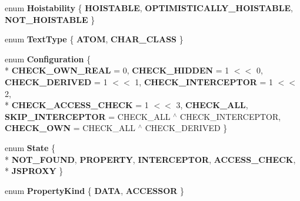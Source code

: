 \begin{DoxyCompactItemize}
\item 
\hypertarget{classv8_1_1internal_1_1_b_a_s_e___e_m_b_e_d_d_e_d_aa09619c6a12a554417df97fe40eab745}{}enum {\bfseries Hoistability} \{ {\bfseries H\+O\+I\+S\+T\+A\+B\+L\+E}, 
{\bfseries O\+P\+T\+I\+M\+I\+S\+T\+I\+C\+A\+L\+L\+Y\+\_\+\+H\+O\+I\+S\+T\+A\+B\+L\+E}, 
{\bfseries N\+O\+T\+\_\+\+H\+O\+I\+S\+T\+A\+B\+L\+E}
 \}\label{classv8_1_1internal_1_1_b_a_s_e___e_m_b_e_d_d_e_d_aa09619c6a12a554417df97fe40eab745}

\item 
\hypertarget{classv8_1_1internal_1_1_b_a_s_e___e_m_b_e_d_d_e_d_adff2dd6e8aec0ffdabe2135301a1dbb6}{}enum {\bfseries Text\+Type} \{ {\bfseries A\+T\+O\+M}, 
{\bfseries C\+H\+A\+R\+\_\+\+C\+L\+A\+S\+S}
 \}\label{classv8_1_1internal_1_1_b_a_s_e___e_m_b_e_d_d_e_d_adff2dd6e8aec0ffdabe2135301a1dbb6}

\item 
\hypertarget{classv8_1_1internal_1_1_b_a_s_e___e_m_b_e_d_d_e_d_ad8a2e468fa3dc4653942cd4be018625a}{}enum {\bfseries Configuration} \{ \\*
{\bfseries C\+H\+E\+C\+K\+\_\+\+O\+W\+N\+\_\+\+R\+E\+A\+L} = 0, 
{\bfseries C\+H\+E\+C\+K\+\_\+\+H\+I\+D\+D\+E\+N} = 1 $<$$<$ 0, 
{\bfseries C\+H\+E\+C\+K\+\_\+\+D\+E\+R\+I\+V\+E\+D} = 1 $<$$<$ 1, 
{\bfseries C\+H\+E\+C\+K\+\_\+\+I\+N\+T\+E\+R\+C\+E\+P\+T\+O\+R} = 1 $<$$<$ 2, 
\\*
{\bfseries C\+H\+E\+C\+K\+\_\+\+A\+C\+C\+E\+S\+S\+\_\+\+C\+H\+E\+C\+K} = 1 $<$$<$ 3, 
{\bfseries C\+H\+E\+C\+K\+\_\+\+A\+L\+L}, 
{\bfseries S\+K\+I\+P\+\_\+\+I\+N\+T\+E\+R\+C\+E\+P\+T\+O\+R} = C\+H\+E\+C\+K\+\_\+\+A\+L\+L $^\wedge$ C\+H\+E\+C\+K\+\_\+\+I\+N\+T\+E\+R\+C\+E\+P\+T\+O\+R, 
{\bfseries C\+H\+E\+C\+K\+\_\+\+O\+W\+N} = C\+H\+E\+C\+K\+\_\+\+A\+L\+L $^\wedge$ C\+H\+E\+C\+K\+\_\+\+D\+E\+R\+I\+V\+E\+D
 \}\label{classv8_1_1internal_1_1_b_a_s_e___e_m_b_e_d_d_e_d_ad8a2e468fa3dc4653942cd4be018625a}

\item 
\hypertarget{classv8_1_1internal_1_1_b_a_s_e___e_m_b_e_d_d_e_d_aea5e836b2c351dd71777783bbf36881f}{}enum {\bfseries State} \{ \\*
{\bfseries N\+O\+T\+\_\+\+F\+O\+U\+N\+D}, 
{\bfseries P\+R\+O\+P\+E\+R\+T\+Y}, 
{\bfseries I\+N\+T\+E\+R\+C\+E\+P\+T\+O\+R}, 
{\bfseries A\+C\+C\+E\+S\+S\+\_\+\+C\+H\+E\+C\+K}, 
\\*
{\bfseries J\+S\+P\+R\+O\+X\+Y}
 \}\label{classv8_1_1internal_1_1_b_a_s_e___e_m_b_e_d_d_e_d_aea5e836b2c351dd71777783bbf36881f}

\item 
\hypertarget{classv8_1_1internal_1_1_b_a_s_e___e_m_b_e_d_d_e_d_a086765593c89c2d75154f11ad7d86671}{}enum {\bfseries Property\+Kind} \{ {\bfseries D\+A\+T\+A}, 
{\bfseries A\+C\+C\+E\+S\+S\+O\+R}
 \}\label{classv8_1_1internal_1_1_b_a_s_e___e_m_b_e_d_d_e_d_a086765593c89c2d75154f11ad7d86671}


\end{DoxyCompactItemize}
